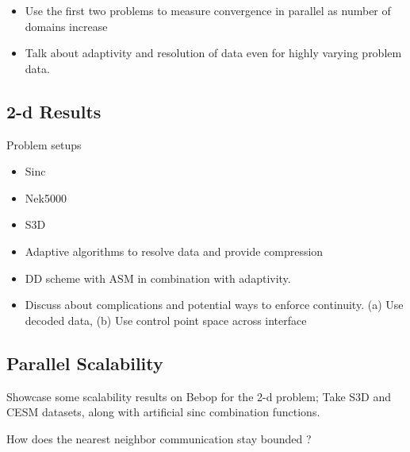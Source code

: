 \documentclass[conference]{IEEEtran}
\begin{document}
\begin{itemize}
	\item Use the first two problems to measure convergence in parallel as number of domains increase
	\item Talk about adaptivity and resolution of data even for highly varying problem data.
\end{itemize}

\subsection{2-d Results}

Problem setups
\begin{itemize}
	\item Sinc
	\item Nek5000
	\item S3D
\end{itemize}


\begin{itemize}
	\item Adaptive algorithms to resolve data and provide compression
	\item DD scheme with ASM in combination with adaptivity.
	\item Discuss about complications and potential ways to enforce continuity. (a) Use decoded data, (b) Use control point space across interface
\end{itemize}

\subsection{Parallel Scalability}

Showcase some scalability results on Bebop for the 2-d problem; Take S3D and CESM datasets, along with artificial sinc combination functions.

How does the nearest neighbor communication stay bounded ?


\end{document}

